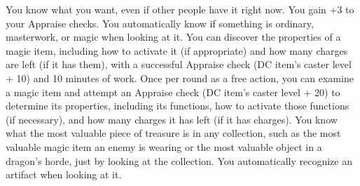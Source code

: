 {You know what you want, even if other people have it right now.}
{You gain +3 to your Appraise checks.}
{You automatically know if something is ordinary, masterwork, or magic when looking at it.}
{You can discover the properties of a magic item, including how to activate it (if appropriate) and how many charges are left (if it has them), with a successful Appraise check (DC item's caster level + 10) and 10 minutes of work.}
{Once per round as a free action, you can examine a magic item and attempt an Appraise check (DC item's caster level + 20) to determine its properties, including its functions, how to activate those functions (if necessary), and how many charges it has left (if it has charges).}
{You know what the most valuable piece of treasure is in any collection, such as the most valuable magic item an enemy is wearing or the most valuable object in a dragon's horde, just by looking at the collection. You automatically recognize an artifact when looking at it.}